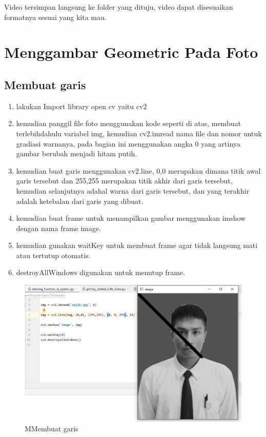 Video tersimpan langsung ke folder yang dituju, video dapat disesuaikan formatnya sesuai yang kita mau.

\newpage
\section{Menggambar Geometric Pada Foto}
\subsection{Membuat garis}

\begin{enumerate}
	\item lakukan Import library open cv yaitu cv2
	\item kemudian panggil file foto menggunakan kode seperti di atas, membuat terlebihdahulu variabel img, kemudian cv2.imread nama file dan nomor untuk gradiasi warnanya, pada bagian ini menggunakan angka 0 yang artinya gambar berubah menjadi hitam putih.
	\item kemudian buat garis menggunakan cv2.line, 0,0 merupakan dimana titik awal garis tersebut dan 255,255 merupakan titik akhir dari garis tersebut, kemudian selanjutnya adahal warna dari garis tersebut, dan yang terakhir adalah ketebalan dari garis yang dibuat.
	\item kemudian buat frame untuk menampilkan gambar menggunakan imshow dengan nama frame image.
	\item kemudian gunakan waitKey untuk membuat frame agar tidak langsung mati atau tertutup otomatis.
	\item destroyAllWindows digunakan untuk menutup frame.
\end{enumerate}

\newpage
\begin{figure}[ht]
\centering
\includegraphics[scale=0.55]{figures/2,8.jpg}
\caption{MMembuat garis}
\label{contoh}
\end{figure}

